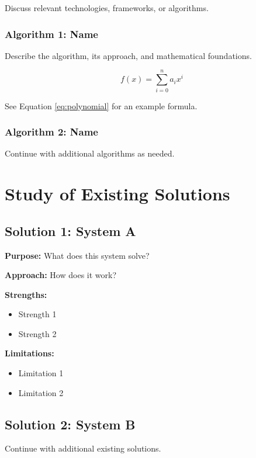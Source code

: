 \documentclass[12pt,a4paper,onecolumn,oneside]{report}
\begin{document}
Discuss relevant technologies, frameworks, or algorithms.

\subsubsection{Algorithm 1: Name}
Describe the algorithm, its approach, and mathematical foundations.

\begin{equation}
    f(x) = \sum_{i=0}^{n} a_i x^i
    \label{eq:polynomial}
\end{equation}

See Equation \ref{eq:polynomial} for an example formula.

\subsubsection{Algorithm 2: Name}
Continue with additional algorithms as needed.

\section{Study of Existing Solutions}
\label{sec:existing}

\subsection{Solution 1: System A}
\label{sec:existing:sysA}

\textbf{Purpose:} What does this system solve?

\textbf{Approach:} How does it work?

\textbf{Strengths:}
\begin{itemize}
    \item Strength 1
    \item Strength 2
\end{itemize}

\textbf{Limitations:}
\begin{itemize}
    \item Limitation 1
    \item Limitation 2
\end{itemize}

\subsection{Solution 2: System B}
\label{sec:existing:sysB}

Continue with additional existing solutions.
\end{document}
